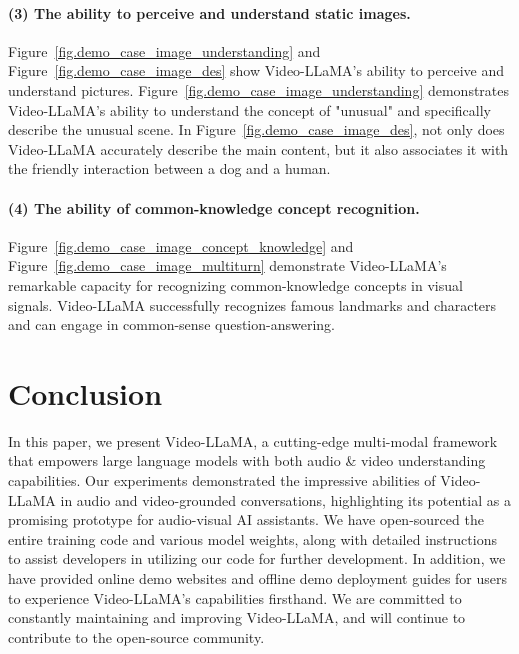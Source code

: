 \documentclass[11pt]{article}
\begin{document}
\paragraph{(3) The ability to perceive and understand static images.} Figure~\ref{fig.demo_case_image_understanding} and Figure~\ref{fig.demo_case_image_des}  show Video-LLaMA's ability to perceive and understand pictures. Figure~\ref{fig.demo_case_image_understanding} demonstrates Video-LLaMA's ability to understand the concept of "unusual" and specifically describe the unusual scene.  In Figure~\ref{fig.demo_case_image_des}, not only does Video-LLaMA accurately describe the main content, but it also associates it with the friendly interaction between a dog and a human.

\paragraph{(4) The ability of common-knowledge concept recognition.} Figure~\ref{fig.demo_case_image_concept_knowledge} and Figure~\ref{fig.demo_case_image_multiturn} demonstrate Video-LLaMA's remarkable capacity for recognizing common-knowledge concepts in visual signals. Video-LLaMA successfully recognizes famous landmarks and characters and can engage in common-sense question-answering.



\section{Conclusion}
In this paper, we present Video-LLaMA, a cutting-edge multi-modal framework that empowers large language models with both audio \& video understanding capabilities. Our experiments  demonstrated the impressive abilities of Video-LLaMA in audio and video-grounded conversations, highlighting its potential as a promising prototype for audio-visual AI assistants. We have open-sourced the entire training code and various model weights, along with detailed instructions to assist developers in utilizing our code for further development. In addition, we have provided online demo websites and offline demo deployment guides for users to experience Video-LLaMA's capabilities firsthand. We are committed to constantly maintaining and improving Video-LLaMA, and will continue to contribute to the open-source community.
\end{document}
